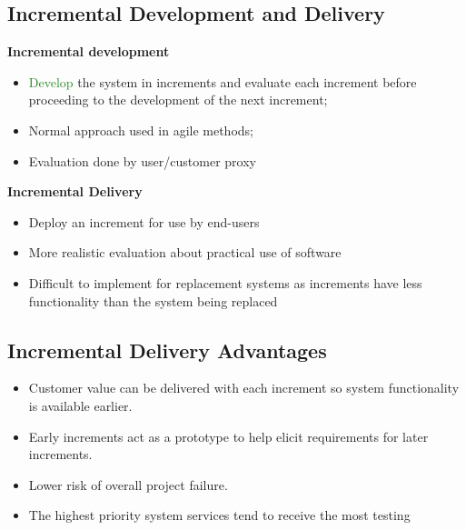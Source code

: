 \documentclass{report}
\newcommand{\textg}[1]{\textcolor{ForestGreen}{#1}}
\begin{document}
\subsection{Incremental Development and Delivery}
\noindent \textbf{Incremental development}
\begin{itemize}
  \item \textg{Develop} the system in increments and evaluate each increment before proceeding to the development of the next increment;
  \item Normal approach used in agile methods;
  \item Evaluation done by user/customer proxy
\end{itemize}
\textbf{Incremental Delivery}
\begin{itemize}
  \item Deploy an increment for use by end-users
  \item More realistic evaluation about practical use of software
  \item Difficult to implement for replacement systems as increments have less functionality than the system being replaced
\end{itemize}

\subsection{Incremental Delivery Advantages}
\begin{itemize}
  \item Customer value can be delivered with each increment so system functionality is available earlier.
  \item Early increments act as a prototype to help elicit requirements for later increments.
  \item Lower risk of overall project failure.
  \item The highest priority system services tend to receive the most testing
\end{itemize}
\end{document}
